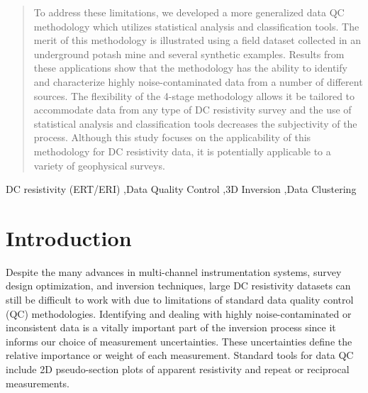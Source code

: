 \documentclass[final,authoryear,5p,times,twocolumn]{elsarticle}
\begin{document}
\begin{frontmatter}
\begin{abstract}
To address these limitations, we developed a more generalized data QC methodology which utilizes statistical analysis and classification tools. The merit of this methodology is illustrated using a field dataset collected in an underground potash mine and several synthetic examples. Results from these applications show that the methodology has the ability to identify and characterize highly noise-contaminated data from a number of different sources. The flexibility of the 4-stage methodology allows it be tailored to accommodate data from any type of DC resistivity survey and the use of statistical analysis and classification tools decreases the subjectivity of the process. Although this study focuses on the applicability of this methodology for DC resistivity data, it is potentially applicable to a variety of geophysical surveys.  

\end{abstract}

\begin{keyword}
DC resistivity (ERT/ERI) \sep  Data Quality Control \sep 3D Inversion \sep Data Clustering


\end{keyword}

\end{frontmatter}

\linenumbers


\section{Introduction}
\label{Introduction}

Despite the many advances in multi-channel instrumentation systems, survey design optimization, and inversion techniques, large DC resistivity datasets can still be difficult to work with due to limitations of standard data quality control (QC) methodologies. Identifying and dealing with highly noise-contaminated or inconsistent data is a vitally important part of the inversion process since it informs our choice of measurement uncertainties.  These uncertainties define the relative importance or weight of each measurement. Standard tools for data QC include 2D pseudo-section plots of apparent resistivity and repeat or reciprocal measurements.  
\end{document}
